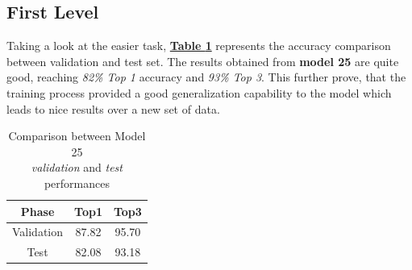 \documentclass[12pt]{article}
\begin{document}
\subsection{First Level}
Taking a look at the easier task, \hyperref[tb:firsttest]{\textbf{Table \ref{tb:firsttest}}} represents the accuracy comparison between validation and test set. The results obtained from \textbf{model 25} are quite good, reaching \textit{82\% Top 1} accuracy and \textit{93\% Top 3}. This further prove, that the training process provided a good generalization capability to the model which leads to nice results over a new set of data.
\begin{table}[ht!]
    \begin{adjustwidth}{}{}
	    \centering
	    \small
	    \begin{tabular}{ |c|c|c| }
        \hline
        \textbf{Phase} & \textbf{Top1} & \textbf{Top3}\\
        \hline
        Validation & 87.82 & 95.70\\
        Test & 82.08 & 93.18\\
        \hline
        \end{tabular}
    \end{adjustwidth}
    \captionsetup{justification   = centering}
    \caption{Comparison between Model 25 \\\textit{validation} and \textit{test} performances}
    \label{tb:firsttest}
\end{table}
\end{document}
